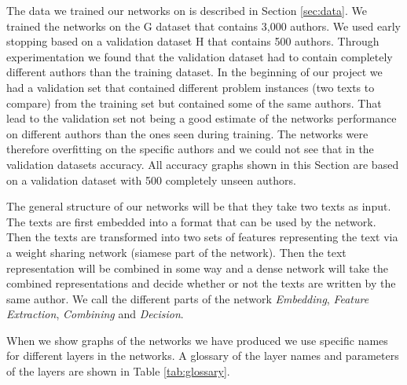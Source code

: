 The data we trained our networks on is described in Section \ref{sec:data}. We
trained the networks on the \gls{G} dataset that contains 3,000 authors. We used
early stopping based on a validation dataset \gls{H} that contains 500 authors.
Through experimentation we found that the validation dataset had to contain
completely different authors than the training dataset. In the beginning of
our project we had a validation set that contained different problem instances
(two texts to compare) from the training set but contained some of the same
authors. That lead to the validation set not being a good estimate of the
networks performance on different authors than the ones seen during training.
The networks were therefore overfitting on the specific authors and we could not
see that in the validation datasets accuracy. All accuracy graphs shown in this
Section are based on a validation dataset with 500 completely unseen authors.

The general structure of our networks will be that they take two texts as input.
The texts are first embedded into a format that can be used by the network.
Then the texts are transformed into two sets of features representing the text
via a weight sharing network (siamese part of the network). Then the text
representation will be combined in some way and a dense network will take the
combined representations and decide whether or not the texts are written by the
same author. We call the different parts of the network \textit{Embedding},
\textit{Feature Extraction}, \textit{Combining} and \textit{Decision}.

When we show graphs of the networks we have produced we use specific names for
different layers in the networks. A glossary of the layer names and parameters
of the layers are shown in Table \ref{tab:glossary}.

